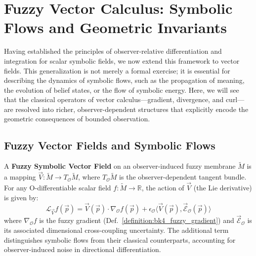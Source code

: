 
\section[Fuzzy Vector Calculus]{Fuzzy Vector Calculus: Symbolic Flows and Geometric Invariants}
\label{sec:bk4_fuzzy_vector_calculus}

Having established the principles of observer-relative differentiation and integration for scalar symbolic fields, we now extend this framework to vector fields. This generalization is not merely a formal exercise; it is essential for describing the dynamics of symbolic flows, such as the propagation of meaning, the evolution of belief states, or the flow of symbolic energy. Here, we will see that the classical operators of vector calculus---gradient, divergence, and curl---are resolved into richer, observer-dependent structures that explicitly encode the geometric consequences of bounded observation.

\subsection{Fuzzy Vector Fields and Symbolic Flows}
\label{subsec:bk4_fuzzy_vector_fields}

\begin{definition}
\label{definition:bk4_fuzzy_vector_field}
A \textbf{Fuzzy Symbolic Vector Field} on an observer-induced fuzzy membrane $\tilde{M}$ is a mapping $\vec{V}: \tilde{M} \to T_{\mathcal{O}}\tilde{M}$, where $T_{\mathcal{O}}\tilde{M}$ is the observer-dependent tangent bundle. For any O-differentiable scalar field $f: \tilde{M} \to \mathbb{R}$, the action of $\vec{V}$ (the Lie derivative) is given by:
\[
\mathcal{L}_{\vec{V}} f(\vec{p}) = \vec{V}(\vec{p}) \cdot \nabla_{\mathcal{O}} f(\vec{p}) + \epsilon_{\mathcal{O}} \langle \vec{V}(\vec{p}), \vec{\mathcal{E}}_{\mathcal{O}}(\vec{p}) \rangle
\]
where $\nabla_{\mathcal{O}}f$ is the fuzzy gradient (Def.~\ref{definition:bk4_fuzzy_gradient}) and $\vec{\mathcal{E}}_{\mathcal{O}}$ is its associated dimensional cross-coupling uncertainty. The additional term distinguishes symbolic flows from their classical counterparts, accounting for observer-induced noise in directional differentiation.
\end{definition}

